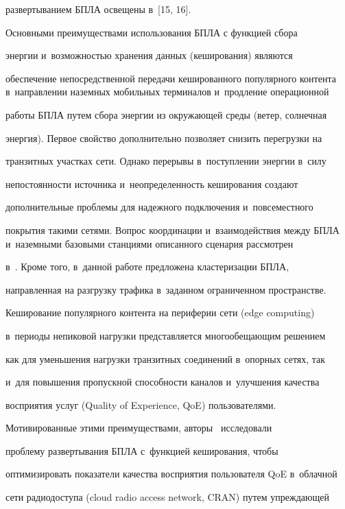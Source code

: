 развертыванием БПЛА освещены в~[15, 16].


  


  Основными преимуществами использования БПЛА с функцией сбора 


энергии и~возможностью хранения данных (кеширования) являются 


обеспечение непосредственной передачи кешированного популярного контента в~направлении наземных мобильных терминалов и~продление операционной 


работы БПЛА путем сбора энергии из окружающей среды (ветер, солнечная 


энергия). Первое свойство дополнительно позволяет снизить перегрузки на 


транзитных участках сети. Однако перерывы в~поступлении энергии в~силу 


непостоянности источника и~неопределенность кеширования создают 


дополнительные проблемы для надежного подключения и~повсеместного 


покрытия такими сетями. Вопрос координации и~взаимодействия между БПЛА и~наземными базовыми станциями описанного сценария рассмотрен  


в~\cite{15-md}. Кроме того, в~данной работе предложена кластеризации БПЛА, 


направленная на разгрузку трафика в~заданном ограниченном пространстве.


  


  Кеширование популярного контента на периферии сети (edge computing) 


в~периоды непиковой нагрузки представляется многообещающим решением 


как для уменьшения нагрузки транзитных соединений в~опорных сетях, так 


и~для повышения пропускной способности каналов и~улучшения качества 


восприятия услуг (Quality of Experience, QoE) пользователями. 


Мотивированные этими преимуществами, авторы~\cite{12-md} исследовали 


проблему развертывания БПЛА с~функцией кеширования, чтобы 


оптимизировать показатели качества восприятия пользователя QoE в~облачной 


сети радиодоступа (cloud radio access network, CRAN) путем упреждающей 


